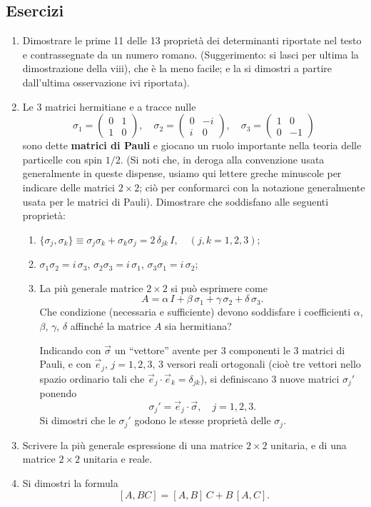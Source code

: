 \documentclass[11pt, a4paper]{book}
\numberwithin{equation}{section}
\newenvironment{esercizi}{\subsection*{Esercizi}\begin{enumerate}}{\end{enumerate}}
\begin{document}
\begin{esercizi}

\item Dimostrare le prime 11 delle 13 proprietà dei determinanti riportate
nel testo e contrassegnate da un numero romano. (Suggerimento: si lasci per
ultima la dimostrazione della viii), che è la meno facile; e la si dimostri
a partire dall'ultima osservazione ivi riportata).

\item Le 3 matrici hermitiane e a tracce nulle
\[
\sigma_1 = \begin{pmatrix} 0 & 1 \\ 1 & 0 \end{pmatrix}, \quad
\sigma_2 = \begin{pmatrix} 0 & -i \\ i & 0 \end{pmatrix}, \quad
\sigma_3 = \begin{pmatrix} 1 & 0 \\ 0 & -1 \end{pmatrix}
\]
sono dette \textbf{matrici di Pauli} e giocano un ruolo importante nella
teoria delle particelle con spin $1/2$. (Si noti che, in deroga alla
convenzione usata generalmente in queste dispense, usiamo qui lettere greche
minuscole per indicare delle matrici $2\times 2$; ciò per conformarci con la
notazione generalmente usata per le matrici di Pauli). Dimostrare che
soddisfano alle seguenti proprietà:
\begin{enumerate}
  \item $\{\sigma_j, \sigma_k\} \equiv \sigma_j \sigma_k + \sigma_k \sigma_j
        = 2\,\delta_{jk}\, I, \quad (j,k = 1,2,3)$;
  \item $\sigma_1 \sigma_2 = i\,\sigma_3$, \quad
        $\sigma_2 \sigma_3 = i\,\sigma_1$, \quad
        $\sigma_3 \sigma_1 = i\,\sigma_2$;
  \item La più generale matrice $2\times 2$ si può esprimere come
    \[
    A = \alpha\, I + \beta\,\sigma_1 + \gamma\,\sigma_2 + \delta\,\sigma_3.
    \]
    Che condizione (necessaria e sufficiente) devono soddisfare i coefficienti
    $\alpha$, $\beta$, $\gamma$, $\delta$ affinché la matrice $A$ sia
    hermitiana?

    Indicando con $\vec{\sigma}$ un ``vettore'' avente per 3 componenti le 3
    matrici di Pauli, e con $\vec{e}_j$, $j=1,2,3$, 3 versori reali
    ortogonali (cioè tre vettori nello spazio ordinario tali che
    $\vec{e}_j \cdot \vec{e}_k = \delta_{jk}$), si definiscano 3 nuove
    matrici $\sigma_j'$ ponendo
    \[
    \sigma_j' = \vec{e}_j \cdot \vec{\sigma}, \quad j=1,2,3.
    \]
    Si dimostri che le $\sigma_j'$ godono le stesse proprietà delle
    $\sigma_j$.
\end{enumerate}

\item Scrivere la più generale espressione di una matrice $2\times 2$
unitaria, e di una matrice $2\times 2$ unitaria e reale.

\item Si dimostri la formula
\[
[A, BC] = [A,B]\,C + B\,[A,C].
\]

\end{esercizi}
\end{document}
